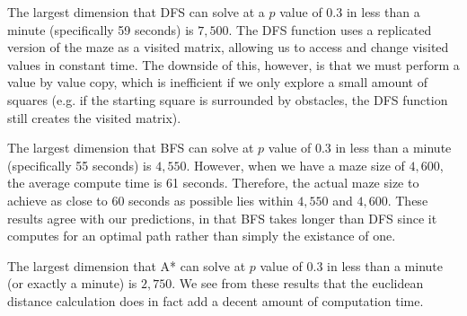 \documentclass[12pt, twoside]{article}
\begin{document}
\begin{enumerate}
        \vspace{4mm}
        The largest dimension that DFS can solve at a $p$ value of 0.3 in less than a minute (specifically 59 seconds) is $7,500$. The DFS function uses a replicated version of the maze as a visited matrix, allowing us to access and change visited values in constant time. The downside of this, however, is that we must perform a value by value copy, which is inefficient if we only explore a small amount of squares (e.g. if the starting square is surrounded by obstacles, the DFS function still creates the visited matrix).

        \vspace{4mm}
        The largest dimension that BFS can solve at $p$ value of 0.3 in less than a minute (specifically 55 seconds) is $4,550$. However, when we have a maze size of $4,600$, the average compute time is 61 seconds. Therefore, the actual maze size to achieve as close to 60 seconds as possible lies within $4,550$ and $4,600$. These results agree with our predictions, in that BFS takes longer than DFS since it computes for an optimal path rather than simply the existance of one.

        \vspace{4mm}
        The largest dimension that A* can solve at $p$ value of 0.3 in less than a minute (or exactly a minute) is $2,750$. We see from these results that the euclidean distance calculation does in fact add a decent amount of computation time. 

        \vfill

\end{enumerate}
\pagebreak
\end{document}
